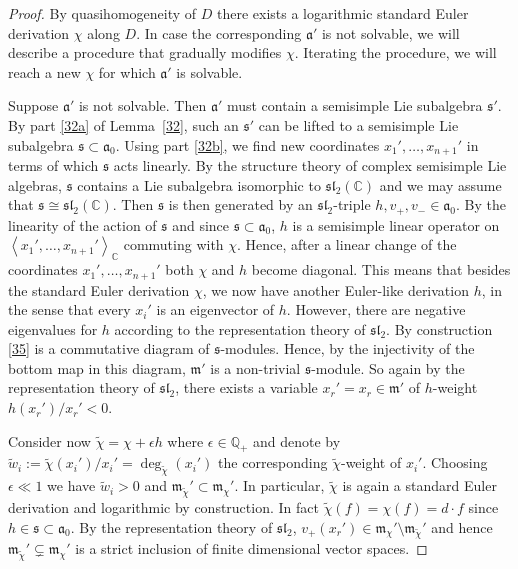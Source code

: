 \begin{proof}
By quasihomogeneity of $D$ there exists a logarithmic standard Euler derivation $\chi$ along $D$.
In case the corresponding ${\mathfrak{a}}'$ is not solvable, we will describe a procedure that gradually modifies $\chi$. 
Iterating the procedure, we will reach a new $\chi$ for which ${\mathfrak{a}}'$ is solvable.

Suppose ${\mathfrak{a}}'$ is not solvable.
Then ${\mathfrak{a}}'$ must contain a semisimple Lie subalgebra ${\mathfrak{s}}'$. 
By part \eqref{32a} of Lemma~\ref{32}, such an ${\mathfrak{s}}'$ can be lifted to a semisimple Lie subalgebra ${\mathfrak{s}}\subset{\mathfrak{a}}_0$. 
Using part \eqref{32b}, we find new coordinates $x_1',\dots,x_{n+1}'$ in terms of which ${\mathfrak{s}}$ acts linearly.
By the structure theory of complex semisimple Lie algebras, ${\mathfrak{s}}$ contains a Lie subalgebra isomorphic to ${\mathfrak{sl}}_2({\mathds{C}})$ and we may assume that ${\mathfrak{s}}\cong{\mathfrak{sl}}_2({\mathds{C}})$.
Then ${\mathfrak{s}}$ is then generated by an ${\mathfrak{sl}}_2$-triple $h,v_+,v_-\in{\mathfrak{a}}_0$.
By the linearity of the action of ${\mathfrak{s}}$ and since ${\mathfrak{s}}\subset{\mathfrak{a}}_0$, $h$ is a semisimple linear operator on ${{\left\langle{x_1',\dots,x_{n+1}'}\right\rangle}}_{\mathds{C}}$ commuting with $\chi$. 
Hence, after a linear change of the coordinates $x_1',\dots,x_{n+1}'$ both $\chi$ and $h$ become diagonal.
This means that besides the standard Euler derivation $\chi$, we now have another Euler-like derivation $h$, in the sense that every $x_i'$ is an eigenvector of $h$.
However, there are negative eigenvalues for $h$ according to the representation theory of ${\mathfrak{sl}}_2$. 
By construction \eqref{35} is a commutative diagram of ${\mathfrak{s}}$-modules.
Hence, by the injectivity of the bottom map in this diagram, ${\mathfrak{m}}'$ is a non-trivial ${\mathfrak{s}}$-module. 
So again by the representation theory of ${\mathfrak{sl}}_2$, there exists a variable $x_r'=x_r\in{\mathfrak{m}}'$ of $h$-weight $h(x_r')/x_r'<0$. 

Consider now $\tilde\chi=\chi+\epsilon h$ where $\epsilon\in{\mathds{Q}}_+$ and denote by $\tilde w_i:=\tilde\chi(x_i')/x_i'=\deg_{\tilde\chi}(x_i')$ the corresponding $\tilde\chi$-weight of $x_i'$.
Choosing $\epsilon\ll1$ we have $\tilde w_i>0$ and ${\mathfrak{m}}_{\tilde\chi}'\subset{\mathfrak{m}}_{\chi}'$.
In particular, $\tilde\chi$ is again a standard Euler derivation and logarithmic by construction.
In fact $\tilde\chi(f)=\chi(f)=d\cdot f$ since $h\in{\mathfrak{s}}\subset{\mathfrak{a}}_0$. 
By the representation theory of ${\mathfrak{sl}}_2$, $v_+(x_r')\in{\mathfrak{m}}_\chi'\setminus{\mathfrak{m}}_{\tilde\chi}'$ and hence ${\mathfrak{m}}_{\tilde\chi}'\subsetneq{\mathfrak{m}}_\chi'$ is a strict inclusion of finite dimensional vector spaces.


\end{proof}
